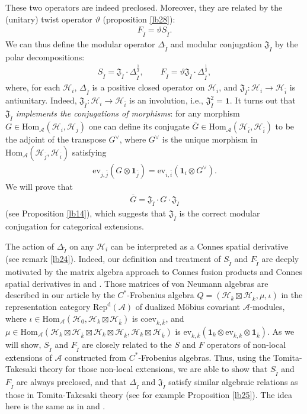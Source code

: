 \documentclass[12pt,a4paper]{article}
\theoremstyle{definition}
\theoremstyle{plain}
\newcommand{\fk}{\mathfrak}
\newcommand{\mc}{\mathcal}
\newcommand{\wtd}{\widetilde}
\newcommand{\ovl}{\overline}
\newcommand{\id}{\mathbf{1}}
\newcommand{\Hom}{\mathrm{Hom}}
\newcommand{\ev}{\mathrm{ev}}
\newcommand{\coev}{\mathrm{coev}}
\newcommand{\RepdA}{\mathrm{Rep}^{\mathrm d}(\mc A)}
\numberwithin{equation}{section}
\begin{document}
These two operators are indeed preclosed. Moreover, they are related by the (unitary) twist operator $\vartheta$ (proposition \ref{lb28}):
\begin{align*}
F_{\wtd I}=\vartheta S_{\wtd I}.
\end{align*}
We can thus define the modular operator $\Delta_{\wtd I}$ and modular conjugation $\fk J_{\wtd I}$ by the polar decompositions:
\begin{align*}
S_{\wtd I}=\fk J_{\wtd I}\cdot \Delta_{\wtd I}^{\frac 12},\qquad F_{\wtd I}=\vartheta\fk J_{\wtd I}\cdot\Delta_{\wtd I}^{\frac 12},
\end{align*}
where, for each $\mc H_i$, $\Delta_{\wtd I}$ is a positive closed operator on $\mc H_i$, and $\fk J_{\wtd I}:\mc H_i\rightarrow\mc H_{\ovl i}$ is antiunitary. Indeed, $\fk J_{\wtd I}:\mc H_i\rightarrow\mc H_{\ovl i}$ is an involution, i.e., $\fk J_{\wtd I}^2=\id$. It turns out that  \emph{$\fk J_{\wtd I}$ implements the conjugations of morphisms}: for any morphism $G\in\Hom_{\mc A}(\mc H_i,\mc H_j)$ one can define its conjugate $\ovl G\in\Hom_{\mc A}(\mc H_{\ovl i},\mc H_{\ovl i})$ to be the adjoint of the transpose $G^\vee$, where $G^\vee$ is the unique morphism in $\Hom_{\mc A}(\mc H_{\ovl j},\mc H_{\ovl i})$ satisfying
\begin{align*}
\ev_{j,\ovl j}(G\otimes\id_{\ovl j})=\ev_{i,\ovl i}(\id_i\otimes G^\vee).
\end{align*}
We will prove that
\begin{align*}
\ovl G=\fk J_{\wtd I}\cdot G\cdot \fk J_{\wtd I}
\end{align*}
(see Proposition \ref{lb14}), which suggests that $\fk J_{\wtd I}$ is the correct modular conjugation for categorical extensions.

The action of $\Delta_{\wtd I}$ on any $\mc H_i$ can be interpreted as a Connes spatial derivative (see remark \ref{lb24}). Indeed, our definition and treatment of $S_{\wtd I}$ and $F_{\wtd I}$ are deeply motivated by the matrix algebra approach to Connes fusion products and Connes spatial derivatives in \cite{Fal00} and \cite[Sec. IX.3]{Tak02}. Those matrices of von Neumann algebras are described in our article by the $C^*$-Frobenius algebra $Q=(\mc H_k\boxtimes\mc H_{\ovl k},\mu,\iota)$ in the representation category $\RepdA$ of dualized M\"obius covariant $\mc A$-modules, where $\iota\in\Hom_{\mc A}(\mc H_0,\mc H_k\boxtimes\mc H_{\ovl k})$ is $\coev_{k,\ovl k}$, and $\mu\in\Hom_{\mc A}(\mc H_k\boxtimes\mc H_{\ovl k}\boxtimes \mc H_k\boxtimes\mc H_{\ovl k},\mc H_k\boxtimes\mc H_{\ovl k})$ is $\ev_{k,\ovl k}(\id_k\otimes\ev_{\ovl k,k}\otimes\id_{\ovl k})$. As we will show, $S_{\wtd I}$ and $F_{\wtd I}$ are closely related to the $S$ and $F$ operators of non-local extensions of $\mc A$ constructed from $C^*$-Frobenius algebras. Thus, using the  Tomita-Takesaki theory for those non-local extensions, we are able to show that $S_{\wtd I}$ and $F_{\wtd I}$ are always preclosed, and that $\Delta_{\wtd I}$ and $\fk J_{\wtd I}$ satisfy similar algebraic relations as those in Tomita-Takesaki theory (see for example Proposition \ref{lb25}). The idea here is the same as in \cite{Fal00} and \cite{Tak02}.
\end{document}
